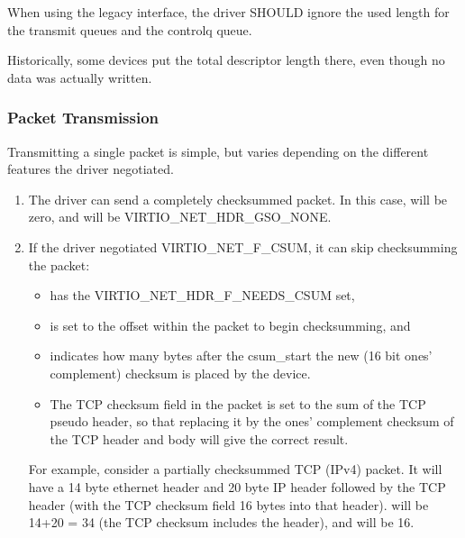 When using the legacy interface, the driver SHOULD ignore the
used length for the transmit queues
and the controlq queue.
\begin{note}
Historically, some devices put
the total descriptor length there, even though no data was
actually written.
\end{note}

\subsubsection{Packet Transmission}\label{sec:Device Types / Network Device / Device Operation / Packet Transmission}

Transmitting a single packet is simple, but varies depending on
the different features the driver negotiated.

\begin{enumerate}
\item The driver can send a completely checksummed packet.  In this case,
   will be zero, and  will be VIRTIO_NET_HDR_GSO_NONE.

\item If the driver negotiated VIRTIO_NET_F_CSUM, it can skip
  checksumming the packet:
  \begin{itemize}
  \item {} has the VIRTIO_NET_HDR_F_NEEDS_CSUM set,

  \item {} is set to the offset within the packet to begin checksumming,
    and

  \item {} indicates how many bytes after the csum_start the
    new (16 bit ones' complement) checksum is placed by the device.

  \item The TCP checksum field in the packet is set to the sum
    of the TCP pseudo header, so that replacing it by the ones'
    complement checksum of the TCP header and body will give the
    correct result.
  \end{itemize}

\begin{note}
For example, consider a partially checksummed TCP (IPv4) packet.
It will have a 14 byte ethernet header and 20 byte IP header
followed by the TCP header (with the TCP checksum field 16 bytes
into that header).  will be 14+20 = 34 (the TCP
checksum includes the header), and  will be 16.
\end{note}


\end{enumerate}
